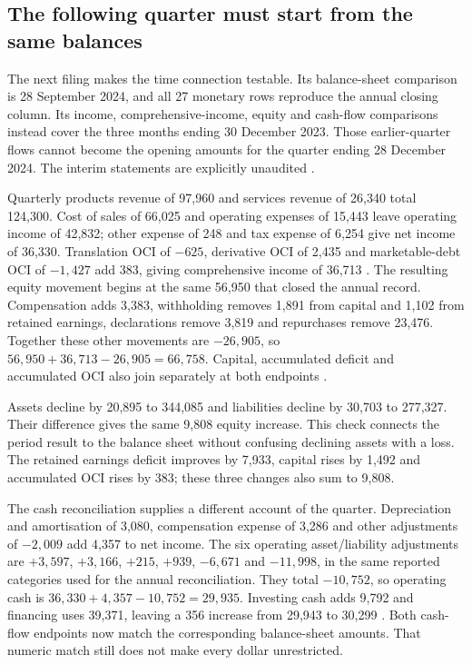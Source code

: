 \subsection{The following quarter must start from the same balances}

The next filing makes the time connection testable. Its balance-sheet
comparison is 28 September 2024, and all 27 monetary rows reproduce the
annual closing column. Its income, comprehensive-income, equity and cash-flow
comparisons instead cover the three months ending 30 December 2023. Those
earlier-quarter flows cannot become the opening amounts for the quarter ending
28 December 2024. The interim statements are explicitly unaudited
\citep[printed pp.~1--5]{apple2025q1}.

Quarterly products revenue of 97,960 and services revenue of 26,340 total
124,300. Cost of sales of 66,025 and operating expenses of 15,443 leave
operating income of 42,832; other expense of 248 and tax expense of 6,254
give net income of 36,330. Translation OCI of $-625$, derivative OCI of
2,435 and marketable-debt OCI of $-1{,}427$ add 383, giving comprehensive
income of 36,713 \citep[printed pp.~1--2]{apple2025q1}. The resulting
equity movement begins at the same 56,950 that closed the annual record.
Compensation adds 3,383, withholding removes 1,891 from capital and 1,102
from retained earnings, declarations remove 3,819 and repurchases remove
23,476. Together these other movements are $-26{,}905$, so
$56{,}950+36{,}713-26{,}905=66{,}758$. Capital, accumulated deficit and
accumulated OCI also join separately at both endpoints
\citep[printed pp.~3--4]{apple2025q1}.

Assets decline by 20,895 to 344,085 and liabilities decline by 30,703 to
277,327. Their difference gives the same 9,808 equity increase. This check
connects the period result to the balance sheet without confusing declining
assets with a loss. The retained earnings deficit improves by 7,933, capital
rises by 1,492 and accumulated OCI rises by 383; these three changes also
sum to 9,808.

The cash reconciliation supplies a different account of the quarter.
Depreciation and amortisation of 3,080, compensation expense of 3,286 and
other adjustments of $-2{,}009$ add 4,357 to net income. The six operating
asset/liability adjustments are $+3{,}597$, $+3{,}166$, $+215$, $+939$,
$-6{,}671$ and $-11{,}998$, in the same reported categories used for the
annual reconciliation. They total $-10{,}752$, so operating cash is
$36{,}330+4{,}357-10{,}752=29{,}935$. Investing cash adds 9,792 and
financing uses 39,371, leaving a 356 increase from 29,943 to 30,299
\citep[printed p.~5]{apple2025q1}. Both cash-flow endpoints now match the
corresponding balance-sheet amounts. That numeric match still does not make
every dollar unrestricted.

